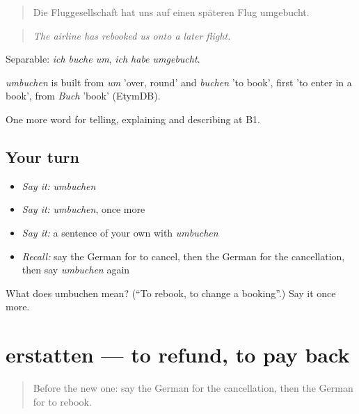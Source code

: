 \begin{quote}
Die Fluggesellschaft hat uns auf einen späteren Flug umgebucht.
\end{quote}

\begin{quote}
\emph{The airline has rebooked us onto a later flight.}
\end{quote}

Separable: \emph{ich buche um}, \emph{ich habe umgebucht}.

\begin{cousinweb}
\emph{umbuchen} is built from \emph{um} 'over, round' and \emph{buchen} 'to book', first 'to enter in a book', from \emph{Buch} 'book' (EtymDB).
\end{cousinweb}

\begin{grammarlens}[title={What you've built}]
One more word for telling, explaining and describing at B1.
\end{grammarlens}

\subsection*{Your turn}
\begin{itemize}
\raggedright
  \item \emph{Say it:} \emph{umbuchen}
  \item \emph{Say it:} \emph{umbuchen}, once more
  \item \emph{Say it:} a sentence of your own with \emph{umbuchen}
  \item \emph{Recall:} say the German for to cancel, then the German for the cancellation, then say \emph{umbuchen} again
\end{itemize}

\begin{tcolorbox}[breakable,colback=teal!4,colframe=teal!35!black,title={Before you move on}]
What does umbuchen mean? (\textquotedblleft{}To rebook, to change a booking\textquotedblright{}.) Say it once more.
\end{tcolorbox}
\section[erstatten]{erstatten — to refund, to pay back}

\label{lesson:GE-C420-erstatten}



\begin{quote}
Before the new one: say the German for the cancellation, then the German for to rebook.
\end{quote}

